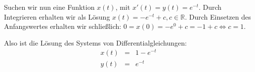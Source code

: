 \documentclass[11pt,a4paper,ngerman]{article}
\begin{document}
Suchen wir nun eine Funktion $x(t)$, mit $x'(t) = y(t) = e^{-t}$. Durch Integrieren erhalten wir als Lösung $x(t) = -e^{-t} + c, c \in \mathbb{R}$. Durch Einsetzen des Anfangswertes erhalten wir schließlich: $0 = x(0) = -e^{0} + c = -1+c \Leftrightarrow c = 1$.

Also ist die Lösung des Systems von Differentialgleichungen:
$$
\begin{array}{lcl}
x(t) &=& 1-e^{-t} \\
y(t) &=& e^{-t}
\end{array}
$$

\label{LastPage}
\end{document}
